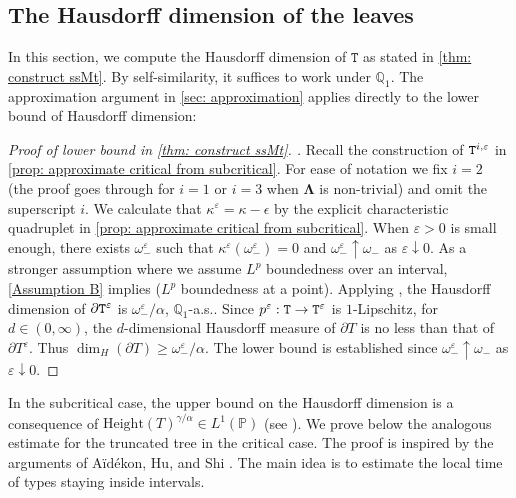 \documentclass[12pt]{article}
\numberwithin{equation}{section}
\theoremstyle{plain}
\theoremstyle{definition}
\newcommand{\Bd}[1]{\boldsymbol{#1}}
\begin{document}
\subsection{The Hausdorff dimension of the leaves}\label{sec: hausdorff dimension}

In this section, we compute the Hausdorff dimension of $\mathtt{T}$ as stated in \cref{thm: construct ssMt}. By self-similarity, it suffices to work under $\mathbb{Q}_1$. The approximation argument in \cref{sec: approximation} applies directly to the lower bound of Hausdorff dimension:

\begin{proof}[Proof of lower bound in \cref{thm: construct ssMt}. ]
Recall the construction of ${\tt T}^{i, \varepsilon}$ in \cref{prop: approximate critical from subcritical}. For ease of notation we fix $i = 2$ (the proof goes through for $i=1$ or $i = 3$ when $\Bd\Lambda$ is non-trivial) and omit the superscript $i$. We calculate that $\kappa^{\varepsilon}=\kappa-\epsilon$ by the explicit characteristic quadruplet in \cref{prop: approximate critical from subcritical}. When $\varepsilon>0$ is small enough, there exists $\omega^{\varepsilon}_-$ such that $\kappa^{\varepsilon}(\omega^{\varepsilon}_-) = 0$ and $\omega_-^{\varepsilon}\uparrow \omega_-$ as $\varepsilon\downarrow 0$. As a stronger assumption where we assume $L^p$ boundedness over an interval, \cref{Assumption B} implies \cite[Assumption 2.13]{BertoinJean2024SMta} ($L^p$ boundedness at a point). Applying \cite[Proposition 6.14]{BertoinJean2024SMta}, the Hausdorff dimension of $\partial{\tt T}^{\varepsilon}$ is $\omega_-^{\varepsilon}/\alpha$, $\mathbb{Q}_1$-a.s.. Since $p^{\varepsilon}: {\tt T}\to {\tt T}^{\varepsilon}$ is $1$-Lipschitz, for $d\in(0, \infty)$, the $d$-dimensional Hausdorff measure of $\partial T$ is no less than that of $\partial T^{\varepsilon}$. Thus $\dim_{H}(\partial T)\geq \omega_-^{\varepsilon}/\alpha$. The lower bound is established since $\omega_-^{\varepsilon}\uparrow \omega_-$ as $\varepsilon\downarrow 0$.
\end{proof}

In the subcritical case, the upper bound on the Hausdorff dimension is a consequence of $\mathrm{Height}(T)^{\gamma/\alpha}\in L^1(\mathbb{P})$ (see \cite[Lemma 2.6]{BertoinJean2024SMta}). We prove below the analogous estimate for the truncated tree in the critical case. The proof is inspired by the arguments of Aïdékon, Hu, and Shi \cite{AidekonElie2024Bodt}. The main idea is to estimate the local time of types staying inside intervals.
\end{document}
